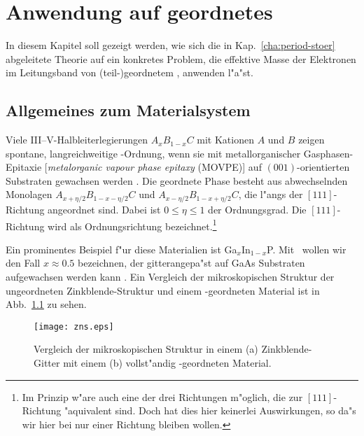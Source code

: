 
\chapter{Anwendung auf geordnetes \GaInP}
\label{cha:anwend}

In diesem Kapitel soll gezeigt werden, wie sich die in
Kap.~\ref{cha:period-stoer} abgeleitete Theorie auf ein konkretes Problem, die
effektive Masse der Elektronen im Leitungsband von (teil-)geordnetem \GaInP,
anwenden l"a"st.

\section{Allgemeines zum Materialsystem}
\label{sec:materialsystem}

Viele III--V-Halbleiterlegierungen $A_{x}B_{1-x}C$ mit Kationen $A$ und $B$
zeigen spontane, langreichweitige \CuPt-Ordnung, wenn sie mit
metallorganischer Gasphasen-Epitaxie [\emph{metalorganic vapour phase epitaxy}
(MOVPE)] auf $(001)$-orientierten Substraten gewachsen werden \cite{zuma:94}.
Die geordnete Phase besteht aus abwechselnden Monolagen
$A_{x+\eta/2}B_{1-x-\eta/2}C$ und $A_{x-\eta/2}B_{1-x+\eta/2}C$, die l"angs
der $[111]$-Richtung angeordnet sind. Dabei ist $0 \le \eta \le 1$ der
Ordnungsgrad. Die $[111]$-Richtung wird als Ordnungsrichtung
bezeichnet.\footnote{Im Prinzip w"are auch eine der drei Richtungen m"oglich,
  die zur $[111]$-Richtung "aquivalent sind. Doch hat dies hier keinerlei
  Auswirkungen, so da"s wir hier bei nur einer Richtung bleiben wollen.}

Ein prominentes Beispiel f"ur diese Materialien ist
Ga$_{x}$In$_{1-x}$P. Mit \GaInP\ wollen wir den Fall $x \approx 0.5$
bezeichnen, der gitterangepa"st auf GaAs Substraten aufgewachsen werden kann
\cite{kipp:97}. Ein Vergleich der mikroskopischen Struktur der ungeordneten
Zinkblende-Struktur und einem \CuPt-geordneten Material ist in
Abb.~\ref{fig:ZnS-CuPt} zu sehen.

\begin{figure}[hbtp]
  \texttt{[image: zns.eps]}
  \caption{Vergleich der mikroskopischen Struktur in einem (a)
    Zinkblende-Gitter mit einem (b) vollst"andig \CuPt-geordneten Material.}
  \label{fig:ZnS-CuPt}
\end{figure}

